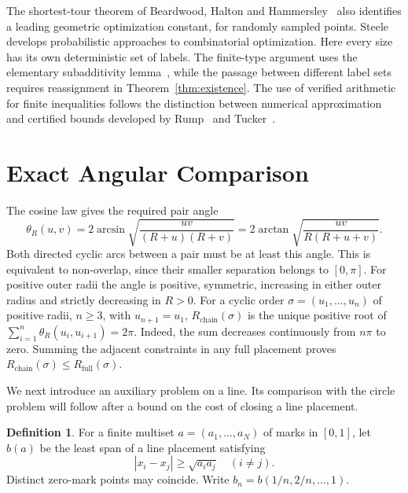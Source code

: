 \documentclass[11pt,letterpaper]{article}
\theoremstyle{definition}\newtheorem{definition}[theorem]{Definition}
\theoremstyle{remark}\newtheorem{remark}[theorem]{Remark}
\newcommand{\ch}{R_{\mathrm{chain}}}
\newcommand{\full}{R_{\mathrm{full}}}
\DeclareMathOperator{\atan}{arctan}
\DeclareMathOperator{\asin}{arcsin}
\begin{document}
The shortest-tour theorem of Beardwood, Halton and Hammersley~\cite{bhh}
also identifies a leading geometric optimization constant, for randomly
sampled points. Steele~\cite{steele} develops probabilistic approaches
to combinatorial optimization. Here every size has its own deterministic
set of labels. The finite-type argument uses the elementary subadditivity
lemma~\cite[Theorem~4.9]{walters}, while the passage between different
label sets requires reassignment in Theorem~\ref{thm:existence}.
The use of verified arithmetic for finite inequalities follows the
distinction between numerical approximation and certified bounds
developed by Rump~\cite{rump} and Tucker~\cite{tucker}.

\section{Exact Angular Comparison}\label{sec:line}

The cosine law gives the required pair angle
\begin{equation}\label{eq:theta}
 \theta_R(u,v)=2\asin\sqrt{\frac{uv}{(R+u)(R+v)}}
 =2\atan\sqrt{\frac{uv}{R(R+u+v)}}.
\end{equation}
Both directed cyclic arcs between a pair must be at least this angle.
This is equivalent to non-overlap, since their smaller separation belongs
to $[0,\pi]$. For positive outer radii the angle is positive, symmetric, increasing in either
outer radius and strictly decreasing in $R>0$.
For a cyclic order $\sigma=(u_1,\ldots,u_n)$ of positive radii, $n\ge3$, with $u_{n+1}=u_1$,
$\ch(\sigma)$ is the unique positive root of
$\sum_{i=1}^n\theta_R(u_i,u_{i+1})=2\pi$.
Indeed, the sum decreases continuously from $n\pi$ to zero. Summing the
adjacent constraints in any full placement proves $\ch(\sigma)\le\full(\sigma)$.

We next introduce an auxiliary problem on a line. Its comparison with the
circle problem will follow after a bound on the cost of closing a line
placement.

\begin{definition}\label{def:line}
For a finite multiset $a=(a_1,\ldots,a_N)$ of marks in $[0,1]$, let $b(a)$
be the least span of a line placement satisfying
\begin{equation}\label{eq:line}
 |x_i-x_j|\ge\sqrt{a_i a_j}\quad(i\ne j).
\end{equation}
Distinct zero-mark points may coincide. Write $b_n=b(1/n,2/n,\ldots,1)$.
\end{definition}
\end{document}
